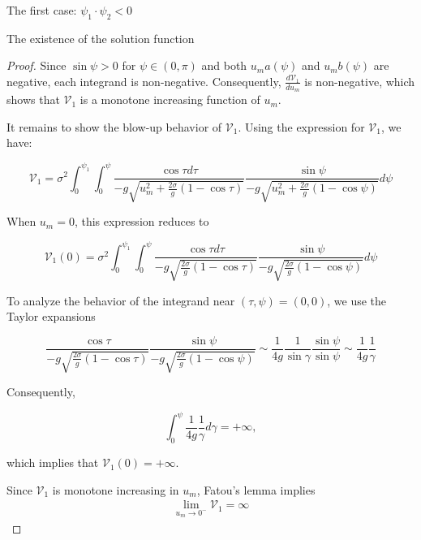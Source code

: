 \documentclass[letterpaper,reqno,10pt,twoside]{amsart}
\theoremstyle{definition}
\theoremstyle{remark}
\begin{document}
\begin{section}{The first case: $\psi_1\cdot \psi_2<0$ }
\begin{subsection}{The existence of the solution function}
\begin{proof}
         \noindent Since $\sin\psi>0$ for $\psi\in(0,\pi)$ and both $u_{m}a(\psi)$ and $u_{m}b(\psi)$ are negative, each integrand is non-negative. Consequently, $\frac{d\mathscr{V}_{1}}{du_{m}}$ is non-negative, which shows that $\mathscr{V}_1$ is a monotone increasing function of $u_m$.

         It remains to show the blow-up behavior of $\mathscr{V}_{1}$. Using the expression for $\mathscr{V}_1$, we have: 

        \begin{equation*}
            \mathscr{V}_{1}=\sigma^{2}\int_{0}^{\psi_1}\int_{0}^{\psi} \frac{\cos\tau d\tau}{-g\sqrt{u_{m}^{2}+\frac{2\sigma}{g}(1-\cos\tau)}} \frac{\sin\psi}{-g\sqrt{u_{m}^{2}+\frac{2\sigma}{g}(1-\cos\psi)}} d\psi
        \end{equation*}

        \noindent When $u_{m}= 0$, this expression reduces to

        \begin{equation*}
            \mathscr{V}_{1}(0)=\sigma^{2}\int_{0}^{\psi_1}\int_{0}^{\psi} \frac{\cos\tau d\tau}{-g\sqrt{\frac{2\sigma}{g}(1-\cos\tau)}} \frac{\sin\psi}{-g\sqrt{\frac{2\sigma}{g}(1-\cos\psi)}} d\psi
        \end{equation*}

        \noindent To analyze the behavior of the integrand near $(\tau,\psi)=(0,0)$, we use the Taylor expansions

        \begin{equation*}
            \frac{\cos\tau}{-g\sqrt{\frac{2\sigma}{g}(1-\cos\tau)}} \frac{\sin\psi}{-g\sqrt{\frac{2\sigma}{g}(1-\cos\psi)}}\sim \frac{1}{4g}\frac{1}{\sin\gamma}\frac{\sin\psi}{\sin\psi}\sim\frac{1}{4g}\frac{1}{\gamma}
        \end{equation*}

        \noindent Consequently,

        \begin{equation*}
            \int_{0}^{\psi}\frac{1}{4g} \frac{1}{\gamma}d\gamma=+\infty,
        \end{equation*}

        \noindent which implies that $\mathscr{V}_1(0)= +\infty$.
        
        Since $\mathscr{V}_{1}$ is monotone increasing in $u_{m}$, Fatou’s lemma implies 
        \begin{align}
            \lim_{u_{m}\rightarrow 0^{-}}\mathscr{V}_{1}=\infty
        \end{align}


\end{proof}
\end{subsection}
\end{section}
\end{document}
